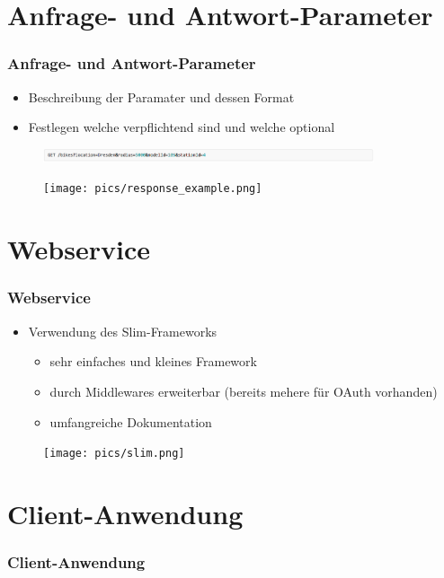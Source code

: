 \section{Anfrage- und Antwort-Parameter}
\begin{frame}
	\frametitle*{Anfrage- und Antwort-Parameter}
	\begin{itemize}
		\item Beschreibung der Paramater und dessen Format
		\item Festlegen welche verpflichtend sind und welche optional
	\end{itemize}
	\begin{figure}
		\centering
		\includegraphics[height=4mm]{pics/request_example.png}
	\end{figure}
	\begin{figure}
		\centering
		\texttt{[image: pics/response\_example.png]}
	\end{figure}
\end{frame}

\section{Webservice}
\begin{frame}
	\frametitle*{Webservice}
	\begin{itemize}
		\item Verwendung des Slim-Frameworks
		\begin{itemize}
			\item sehr einfaches und kleines Framework
			\item durch Middlewares erweiterbar (bereits mehere für OAuth vorhanden)
			\item umfangreiche Dokumentation
		\end{itemize}
	\end{itemize}
\begin{figure}
		\centering
		\texttt{[image: pics/slim.png]}
	\end{figure}
\end{frame}

\section{Client-Anwendung}
\begin{frame}
	\frametitle*{Client-Anwendung}

\end{frame}

